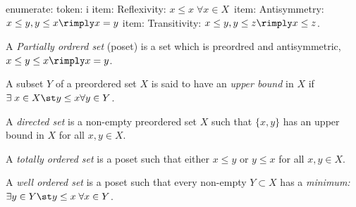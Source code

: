     enumerate:
        token:
            i
        item:
            Reflexivity: $x \le x \; \forall x \in X$\
        item:
            Antisymmetry: $x \le y, y \le x \rimply x=y$
        item:
            Transitivity: $x \le y, y \le z \rimply x \le z$.
    
    A \emph{Partially ordrerd set} (poset) is a set which is preordred and antisymmetric, $x \le y \le x \rimply x=y$.
    
    A subset $Y$ of a preordered set $X$ is said to have an \emph{upper bound} in $X$ if $\exists \; x \in X \st y \le x \forall y \in Y$.
    
    A \emph{directed set} is a non-empty preordered set $X$ such that $\{x,y\}$ has an upper bound in $X$ for all $x,y \in X$.
    
    A \emph{totally ordered set} is a poset such that either $x \le y$ or $y \le x$ for all $x,y \in X$.
    
    A \emph{well ordered set} is a poset such that every non-empty $Y \subset X$ has a \emph{minimum:} $\exists y \in Y \st y \le x \; \forall x \in Y$.
    












